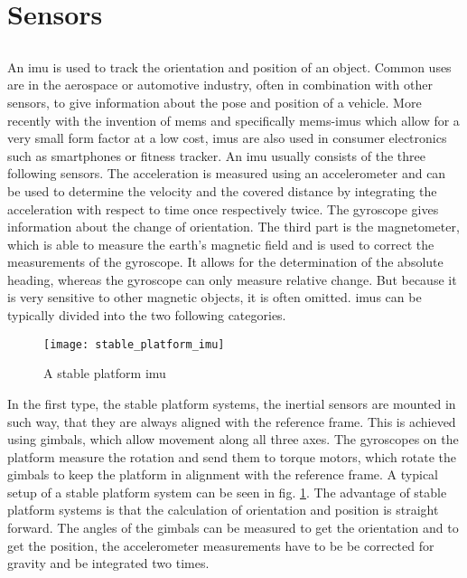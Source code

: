 \section{Sensors}
\subsection{}
An \gls{imu} is used to track the orientation and position of an object.
Common uses are in the aerospace or automotive industry, often in combination with other sensors, to give information about the pose and position of a vehicle.
More recently with the invention of \gls{mems} and specifically \gls{mems}-\gls{imu}s which allow for a very small form factor at a low cost, \gls{imu}s are also used in consumer electronics such as smartphones or fitness tracker.
An \gls{imu} usually consists of the three following sensors.
The acceleration is measured using an accelerometer and can be used to determine the velocity and the covered distance by integrating the acceleration with respect to time once respectively twice.
The gyroscope gives information about the change of orientation.
The third part is the magnetometer, which is able to measure the earth's magnetic field and is used to correct the measurements of the gyroscope.
It allows for the determination of the absolute heading, whereas the gyroscope can only measure relative change. But because it is very sensitive to other magnetic objects, it is often omitted.
\gls{imu}s can be typically divided into the two following categories.\\
\begin{figure}[htbp]
	\centering
	\texttt{[image: stable\_platform\_imu]}
	\caption{A stable platform \acrshort{imu} \cite{Woodman07anintroduction}}
	\label{fig:stable_platform_imu}
\end{figure}
In the first type, the stable platform systems, the inertial sensors are mounted in such way, that they are always aligned with the reference frame.
This is achieved using gimbals, which allow movement along all three axes.
The gyroscopes on the platform measure the rotation and send them to torque motors, which rotate the gimbals to keep the platform in alignment with the reference frame.
A typical setup of a stable platform system can be seen in fig. \ref{fig:stable_platform_imu}.
The advantage of stable platform systems is that the calculation of orientation and position is straight forward.
The angles of the gimbals can be measured to get the orientation and to get the position, the accelerometer measurements have to be be corrected for gravity and be integrated two times.
